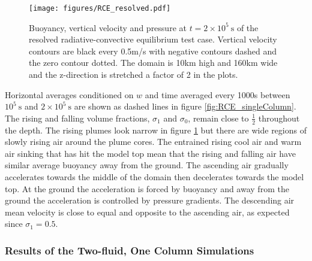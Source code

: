 \documentclass[draft]{agujournal2019}
\begin{document}
\begin{figure}
\noindent 
\texttt{[image: figures/RCE\_resolved.pdf]}
\caption{\label{fig:RCE_resolved}
Buoyancy, vertical velocity and pressure at $t=2\times10^{5}\ \text{s}$
of the resolved radiative-convective equilibrium test case. Vertical
velocity contours are black every 0.5m/s with negative contours dashed
and the zero contour dotted. The domain is 10km high and 160km wide
and the z-direction is stretched a factor of 2 in the plots.}
\end{figure}

Horizontal averages conditioned on $w$ and time averaged every 1000s
between $10^{5}\ \text{s}$ and $2\times10^{5}\ \text{s}$ are shown
as dashed lines in figure \ref{fig:RCE_singleColumn}. The rising and
falling volume fractions, $\sigma_{1}$ and $\sigma_{0}$, remain
close to $\frac{1}{2}$ throughout the depth. The rising plumes look
narrow in figure \ref{fig:RCE_resolved} but there are wide regions
of slowly rising air around the plume cores. The entrained rising
cool air and warm air sinking that has hit the model top mean that
the rising and falling air have similar average buoyancy away from
the ground. The ascending air gradually accelerates towards the middle
of the domain then decelerates towards the model top. At the ground
the acceleration is forced by buoyancy and away from the ground the
acceleration is controlled by pressure gradients. The descending air
mean velocity is close to equal and opposite to the ascending air,
as expected since $\sigma_{1}=0.5$.

\subsubsection{Results of the Two-fluid, One Column Simulations}
\end{document}
